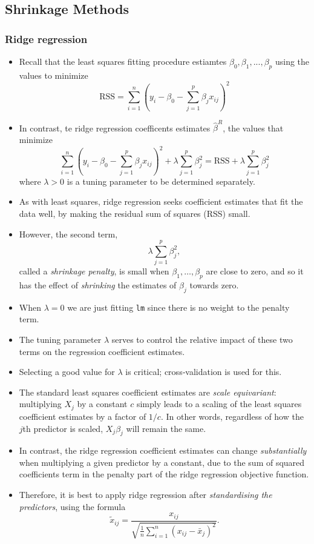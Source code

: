 \documentclass{article}
\begin{document}
\subsection{Shrinkage Methods}

\subsubsection{Ridge regression}
\begin{itemize}
    \item Recall that the least squares fitting procedure estiamtes $\beta_0, \beta_1, ..., \beta_p$ using the values to minimize
    \begin{equation*}
        \mathrm{RSS} = \sum_{i=1}^n (y_i - \beta_0 - \sum_{j=1}^p \beta_j x_{ij})^2
    \end{equation*}
    \item In contrast, te ridge regression coefficents estimates $\hat{\beta}^R$, the values that minimize
    \begin{equation*}
        \sum_{i=1}^n (y_i - \beta_0 - \sum_{j=1}^p \beta_j x_{ij})^2 + \lambda \sum_{j=1}^p \beta_j^2 = \mathrm{RSS} + \lambda \sum_{j=1}^p \beta_j^2
    \end{equation*}
    where $\lambda>0$ is a tuning parameter to be determined separately.
    \item As with least squares, ridge regression seeks coefficient estimates that fit the data well, by making the residual sum of squares (RSS) small.
    \item However, the second term, 
    \[
      \lambda \sum_{j=1}^p \beta_j^2,
    \]
    called a \emph{shrinkage penalty}, is small when \(\beta_1,\dots,\beta_p\) are close to zero, and so it has the effect of \emph{shrinking} the estimates of \(\beta_j\) towards zero.
    \item When $\lambda = 0$ we are just fitting \texttt{lm} since there is no weight to the penalty term.
    \item The tuning parameter \(\lambda\) serves to control the relative impact of these two terms on the regression coefficient estimates.
    \item Selecting a good value for \(\lambda\) is critical; cross‐validation is used for this.
    \item The standard least squares coefficient estimates are \emph{scale equivariant}: multiplying \(X_j\) by a constant \(c\) simply leads to a scaling of the least squares coefficient estimates by a factor of \(1/c\).  In other words, regardless of how the \(j\)th predictor is scaled, \(X_j \beta_j\) will remain the same. 
    \item In contrast, the ridge regression coefficient estimates can change \emph{substantially} when multiplying a given predictor by a constant, due to the sum of squared coefficients term in the penalty part of the ridge regression objective function.
    \item Therefore, it is best to apply ridge regression after \emph{standardising the predictors}, using the formula
    \[
      \tilde{x}_{ij}
      = \frac{x_{ij}}
             {\sqrt{\displaystyle\frac{1}{n}\sum_{i=1}^n (x_{ij}-\bar{x}_j)^2}}.
    \]
\end{itemize}
\end{document}

